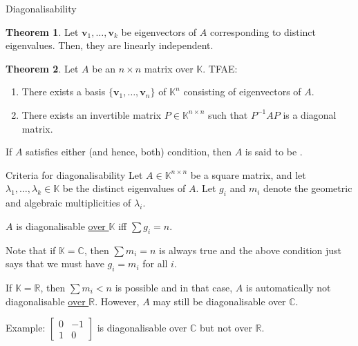 \documentclass[dvipsnames]{beamer}
\theoremstyle{definition}
\newtheorem{thm}{Theorem}
\begin{document}
\begin{frame}{Diagonalisability}
    \begin{thm}
        Let $\mathbf{v}_{1}, \ldots, \mathbf{v}_{k}$ be eigenvectors of $A$ corresponding to distinct eigenvalues. \pause Then, they are linearly independent.
    \end{thm}

    \begin{thm}
        Let $A$ be an $n \times n$ matrix over $\mathbb{K}$. TFAE: \pause
        \begin{enumerate}[<+->]
            \item There exists a basis $\{\mathbf{v}_{1}, \ldots, \mathbf{v}_{n}\}$ of $\mathbb{K}^{n}$ consisting of eigenvectors of $A$.
            \item There exists an invertible matrix $P \in \mathbb{K}^{n \times n}$ such that $P^{-1} A P$ is a diagonal matrix.
        \end{enumerate}
    \end{thm} \pause

    If $A$ satisfies either (and hence, both) condition, then $A$ is said to be .
\end{frame}
\begin{frame}{Criteria for diagonalisability}
    Let $A \in \mathbb{K}^{n \times n}$ be a square matrix, and let $\lambda_{1}, \ldots, \lambda_{k} \in \mathbb{K}$ be the distinct eigenvalues of $A$. \newline \pause
    Let $g_{i}$ and $m_{i}$ denote the geometric and algebraic multiplicities of $\lambda_{i}$. \pause 
    
    $A$ is diagonalisable \underline{over $\mathbb{K}$} iff $\boxed{\sum g_{i} = n}$. \pause

    Note that if $\mathbb{K} = \mathbb{C}$, then $\sum m_{i} = n$ is always true \pause and the above condition just says that we must have $g_{i} = m_{i}$ for all $i$. \pause

    If $\mathbb{K} = \mathbb{R}$, then $\sum m_{i} < n$ is possible \pause and in that case, $A$ is automatically not diagonalisable \underline{over $\mathbb{R}$}. \pause However, $A$ may still be diagonalisable over $\mathbb{C}$. \pause

    Example: $\begin{bmatrix}
        0 & -1 \\
        1 & 0
    \end{bmatrix}$ is diagonalisable over $\mathbb{C}$ but not over $\mathbb{R}$.
\end{frame}
\end{document}
